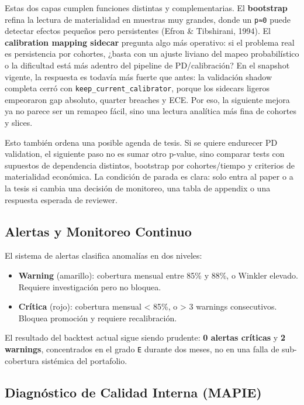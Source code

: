 \documentclass[
  spanish,
  11pt,
  letterpaper,
]{scrbook}
\providecommand{\tightlist}{%
  \setlength{\itemsep}{0pt}\setlength{\parskip}{0pt}}
\theoremstyle{plain}
\theoremstyle{remark}
\begin{document}
Estas dos capas cumplen funciones distintas y complementarias. El
\textbf{bootstrap} refina la lectura de materialidad en muestras muy
grandes, donde un \texttt{p≈0} puede detectar efectos pequeños pero
persistentes (Efron \& Tibshirani, 1994). El \textbf{calibration mapping
sidecar} pregunta algo más operativo: si el problema real es
persistencia por cohortes, ¿basta con un ajuste liviano del mapeo
probabilístico o la dificultad está más adentro del pipeline de
PD/calibración? En el snapshot vigente, la respuesta es todavía más
fuerte que antes: la validación shadow completa cerró con
\texttt{keep\_current\_calibrator}, porque los sidecars ligeros
empeoraron gap absoluto, quarter breaches y ECE. Por eso, la siguiente
mejora ya no parece ser un remapeo fácil, sino una lectura analítica más
fina de cohortes y slices.

Esto también ordena una posible agenda de tesis. Si se quiere endurecer
PD validation, el siguiente paso no es sumar otro p-value, sino comparar
tests con supuestos de dependencia distintos, bootstrap por
cohortes/tiempo y criterios de materialidad económica. La condición de
parada es clara: solo entra al paper o a la tesis si cambia una decisión
de monitoreo, una tabla de appendix o una respuesta esperada de
reviewer.

\subsection{Alertas y Monitoreo
Continuo}\label{alertas-y-monitoreo-continuo}

El sistema de alertas clasifica anomalías en dos niveles:

\begin{itemize}
\tightlist
\item
  \textbf{Warning} (amarillo): cobertura mensual entre 85\% y 88\%, o
  Winkler elevado. Requiere investigación pero no bloquea.
\item
  \textbf{Crítica} (rojo): cobertura mensual \textless{} 85\%, o
  \textgreater{} 3 warnings consecutivos. Bloquea promoción y requiere
  recalibración.
\end{itemize}

El resultado del backtest actual sigue siendo prudente: \textbf{0
alertas críticas} y \textbf{2 warnings}, concentrados en el grado
\texttt{E} durante dos meses, no en una falla de sub-cobertura sistémica
del portafolio.

\subsection{Diagnóstico de Calidad Interna
(MAPIE)}\label{diagnuxf3stico-de-calidad-interna-mapie}
\end{document}
